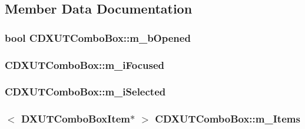 \subsection{Member Data Documentation}
\hypertarget{class_c_d_x_u_t_combo_box_aa39eaf7eff000dd8dcfc8fac5eb8c8e6}{
\subsubsection[{m\_\-bOpened}]{\setlength{\rightskip}{0pt plus 5cm}bool {\bf CDXUTComboBox::m\_\-bOpened}}}
\label{class_c_d_x_u_t_combo_box_aa39eaf7eff000dd8dcfc8fac5eb8c8e6}
\hypertarget{class_c_d_x_u_t_combo_box_abd641180c69582003b5f40f49c9027b2}{
\subsubsection[{m\_\-iFocused}]{ {\bf CDXUTComboBox::m\_\-iFocused}}}
\label{class_c_d_x_u_t_combo_box_abd641180c69582003b5f40f49c9027b2}
\hypertarget{class_c_d_x_u_t_combo_box_a99b930287892598483a9f781d64fec12}{
\subsubsection[{m\_\-iSelected}]{ {\bf CDXUTComboBox::m\_\-iSelected}}}
\label{class_c_d_x_u_t_combo_box_a99b930287892598483a9f781d64fec12}
\hypertarget{class_c_d_x_u_t_combo_box_a40515ea29c58caaf49d309be5a6bb2fb}{
\subsubsection[{m\_\-Items}]{$<$ {\bf DXUTComboBoxItem}$\ast$ $>$ {\bf CDXUTComboBox::m\_\-Items}}}
